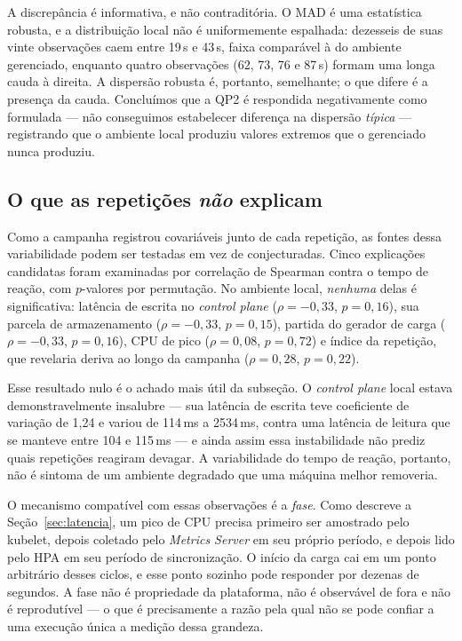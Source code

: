 \documentclass[conference]{IEEEtran}
\begin{document}
A discrepância é informativa, e não contraditória. O MAD é uma estatística
robusta, e a distribuição local não é uniformemente espalhada: dezesseis de suas
vinte observações caem entre 19\,s e 43\,s, faixa comparável à do ambiente
gerenciado, enquanto quatro observações (62, 73, 76 e 87\,s) formam uma longa
cauda à direita. A dispersão robusta é, portanto, semelhante; o que difere é a
presença da cauda. Concluímos que a QP2 é respondida negativamente como
formulada --- não conseguimos estabelecer diferença na dispersão \emph{típica}
--- registrando que o ambiente local produziu valores extremos que o gerenciado
nunca produziu.

\subsection{O que as repetições \emph{não} explicam}

Como a campanha registrou covariáveis junto de cada repetição, as fontes dessa
variabilidade podem ser testadas em vez de conjecturadas. Cinco explicações
candidatas foram examinadas por correlação de Spearman contra o tempo de reação,
com $p$-valores por permutação. No ambiente local, \emph{nenhuma} delas é
significativa: latência de escrita no \emph{control plane} ($\rho=-0{,}33$,
$p=0{,}16$), sua parcela de armazenamento ($\rho=-0{,}33$, $p=0{,}15$), partida
do gerador de carga ($\rho=-0{,}33$, $p=0{,}16$), CPU de pico ($\rho=0{,}08$,
$p=0{,}72$) e índice da repetição, que revelaria deriva ao longo da campanha
($\rho=0{,}28$, $p=0{,}22$).

Esse resultado nulo é o achado mais útil da subseção. O \emph{control plane}
local estava demonstravelmente insalubre --- sua latência de escrita teve
coeficiente de variação de 1,24 e variou de 114\,ms a 2534\,ms, contra uma
latência de leitura que se manteve entre 104 e 115\,ms --- e ainda assim essa
instabilidade não prediz quais repetições reagiram devagar. A variabilidade do
tempo de reação, portanto, não é sintoma de um ambiente degradado que uma máquina
melhor removeria.

O mecanismo compatível com essas observações é a \emph{fase}. Como descreve a
Seção~\ref{sec:latencia}, um pico de CPU precisa primeiro ser amostrado pelo
kubelet, depois coletado pelo \emph{Metrics Server} em seu próprio período, e
depois lido pelo HPA em seu período de sincronização. O início da carga cai em um
ponto arbitrário desses ciclos, e esse ponto sozinho pode responder por dezenas
de segundos. A fase não é propriedade da plataforma, não é observável de fora e
não é reprodutível --- o que é precisamente a razão pela qual não se pode confiar
a uma execução única a medição dessa grandeza.
\end{document}

